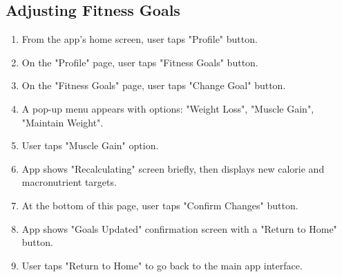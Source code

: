 \documentclass[conference]{IEEEtran}
\begin{document}
\subsection{Adjusting Fitness Goals}
\begin{enumerate}
\item From the app's home screen, user taps "Profile" button.
\item On the "Profile" page, user taps "Fitness Goals" button.
\item On the "Fitness Goals" page, user taps "Change Goal" button.
\item A pop-up menu appears with options: "Weight Loss", "Muscle Gain", "Maintain Weight".
\item User taps "Muscle Gain" option.
\item App shows "Recalculating" screen briefly, then displays new calorie and macronutrient targets.
\item At the bottom of this page, user taps "Confirm Changes" button.
\item App shows "Goals Updated" confirmation screen with a "Return to Home" button.
\item User taps "Return to Home" to go back to the main app interface.
\end{enumerate}
\end{document}
